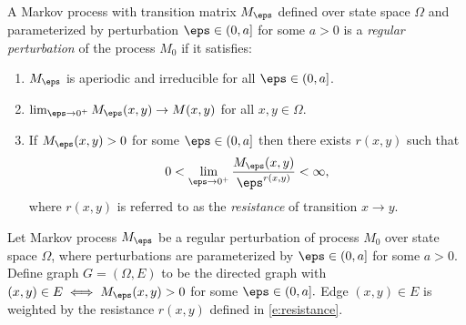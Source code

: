\begin{defn}
A Markov process with transition matrix $M_\eps$ defined over state space $\Omega$ and parameterized by perturbation $\eps\in (0,a]$ for some $a>0$ is a \emph{regular perturbation} of the process $M_0$ if it satisfies:
\begin{enumerate}[leftmargin=1.5em]
\item $M_\eps$ is aperiodic and irreducible for all $\eps\in (0,a]$.
\item $\lim_{\eps\to 0^+}M_\eps (x,y) \to M(x,y)$ for all $x,y\in\Omega.$
\item If $M_\eps(x,y) >0$ for some $\eps \in (0,a]$ then there exists $r(x,y)$ such that 
\begin{equation}\label{e:resistance}
0<\lim_{\eps\to 0^+} {M_\eps(x,y)\over \eps^{r(x,y)}} <\infty,
\end{equation}
where $r(x,y)$ is referred to as the \emph{resistance} of transition $x\to y$.
\end{enumerate}
\end{defn}

Let Markov process $M_\eps$ be a regular perturbation of process $M_0$ over state space $\Omega$, where perturbations are parameterized by $\eps\in (0,a]$ for some $a>0.$ Define graph $G = (\Omega,E)$ to be the directed graph with $(x,y)\in E \iff M_\eps(x,y)>0$ for some $\eps\in(0,a].$ Edge $(x,y)\in E$ is weighted by the resistance $r(x,y)$ defined in \eqref{e:resistance}.

